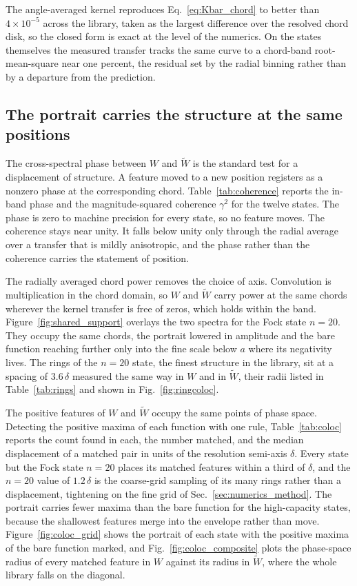 \documentclass[%
  aps, amsmath, amssymb, onecolumn, 11pt
]{revtex4-2}
\begin{document}
The angle-averaged kernel reproduces Eq.~\eqref{eq:Kbar_chord} to better than
$4\times10^{-5}$ across the library, taken as the largest difference over the
resolved chord disk, so the closed form is exact at the level of the numerics.
On the states themselves the measured transfer tracks the same curve to a
chord-band root-mean-square near one percent, the residual set by the radial
binning rather than by a departure from the prediction.

\subsection{The portrait carries the structure at the same positions}
\label{sec:numerics_position}

The cross-spectral phase between $W$ and $\widetilde W$ is the standard test
for a displacement of structure. A feature moved to a new position registers as
a nonzero phase at the corresponding chord. Table~\ref{tab:coherence} reports
the in-band phase and the magnitude-squared coherence $\gamma^2$ for the twelve
states. The phase is zero to machine precision for every state, so no feature
moves. The coherence stays near unity. It falls below unity only through the
radial average over a transfer that is mildly anisotropic, and the phase rather
than the coherence carries the statement of position.

The radially averaged chord power removes the choice of axis. Convolution is
multiplication in the chord domain, so $W$ and $\widetilde W$ carry power at the
same chords wherever the kernel transfer is free of zeros, which holds within
the band. Figure~\ref{fig:shared_support} overlays the two spectra for the Fock
state $n=20$. They occupy the same chords, the portrait lowered in amplitude and
the bare function reaching further only into the fine scale below $a$
where its negativity lives. The rings of the $n=20$ state, the finest structure
in the library, sit at a spacing of $3.6\,\delta$ measured the same way in $W$
and in $\widetilde W$, their radii listed in Table~\ref{tab:rings} and shown in
Fig.~\ref{fig:ringcoloc}.

The positive features of $W$ and $\widetilde W$ occupy the same points of phase
space. Detecting the positive maxima of each function with one rule,
Table~\ref{tab:coloc} reports the count found in each, the number matched, and
the median displacement of a matched pair in units of the resolution semi-axis
$\delta$. Every state but the Fock state $n=20$ places its matched features
within a third of $\delta$, and the $n=20$ value of $1.2\,\delta$ is the
coarse-grid sampling of its many rings rather than a displacement, tightening on
the fine grid of Sec.~\ref{sec:numerics_method}. The portrait carries fewer
maxima than the bare function for the high-capacity states, because the
shallowest features merge into the envelope rather than move.
Figure~\ref{fig:coloc_grid} shows the portrait of each state with the positive
maxima of the bare function marked, and Fig.~\ref{fig:coloc_composite} plots the
phase-space radius of every matched feature in $W$ against its radius in
$\widetilde W$, where the whole library falls on the diagonal.
\end{document}
